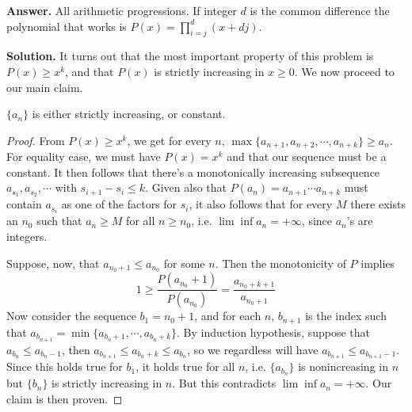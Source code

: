 \documentclass[11pt,a4paper]{article}
\begin{document}
\begin{enumerate}
		\textbf{Answer.} All arithmetic progressions. If integer $d$ is the common difference the polynomial that works is $P(x)=\prod_{i=j}^d (x+dj)$. 
		
		\textbf{Solution.} 
		It turns out that the most important property of this problem is $P(x)\ge x^k$, 
		and that $P(x)$ is strictly increasing in $x\ge 0$. 
		We now proceed to our main claim. 
		
		\begin{lemma}
			$\{a_n\}$ is either strictly increasing, or constant. 
		\end{lemma}
	    
	    \begin{proof}
	    	From $P(x)\ge x^k$, we get for every $n$, $\max\{a_{n+1}, a_{n+2}, \cdots , a_{n+k}\}\ge a_n$. 
	    	For equality case, we must have $P(x)=x^k$ and that our sequence must be a constant. 
	    	It then follows that there's a monotonically increasing subsequence $a_{s_1}, a_{s_2}, \cdots $ 
	    	with $s_{i+1}-s_i\le k$. 
	    	Given also that $P(a_n)=a_{n+1}\cdots a_{n+k}$ must contain $a_{s_i}$ as one of the factors for $s_i$, 
	    	it also follows that for every $M$ there exists an $n_0$ such that $a_n\ge M$ for all $n\ge n_0$, 
	    	i.e. $\lim\inf a_n = +\infty$, since $a_n$'s are integers. 
	    	
	    	Suppose, now, that $a_{n_0+1}\le a_{n_0}$ for some $n$. 
	    	Then the monotonicity of $P$ implies 
	    	\[
	    	1\ge \frac{P(a_{n_0}+1)}{P(a_{n_0})}=\frac{a_{n_0+k+1}}{a_{n_0+1}}
	    	\]
	    	Now consider the sequence $b_1 = n_0+1$, and for each $n$, $b_{n+1}$ is the index such that 
	    	$a_{b_{n+1}}=\min \{a_{b_n+1}, \cdots, a_{b_n+k}\}$. 
	    	By induction hypothesis, 
	    	suppose that $a_{b_{n}}\le a_{b_n - 1}$, then $a_{b_{n+1}}\le a_{b_n+k}\le a_{b_n}$, 
	    	so we regardless will have $a_{b_{n+1}}\le a_{b_{n+1}-1}$. 
	    	Since this holds true for $b_1$, it holds true for all $n$, 
	    	i.e. $\{a_{b_n}\}$ is nonincreasing in $n$ but $\{b_n\}$ is strictly increasing in $n$. 
	    	But this contradicts $\lim\inf a_n = +\infty$. Our claim is then proven. 
	    \end{proof}
		

\end{enumerate}
\end{document}
